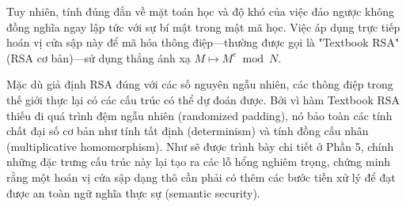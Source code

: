 Tuy nhiên, tính đúng đắn về mặt toán học và độ khó của việc đảo ngược không đồng nghĩa ngay lập tức với sự bí mật trong mật mã học. Việc áp dụng trực tiếp hoán vị cửa sập này để mã hóa thông điệp---thường được gọi là "Textbook RSA" (RSA cơ bản)---sử dụng thẳng ánh xạ $M \mapsto M^e \bmod N$.

Mặc dù giả định RSA đúng với các số nguyên ngẫu nhiên, các thông điệp trong thế giới thực lại có các cấu trúc có thể dự đoán được. Bởi vì hàm Textbook RSA thiếu đi quá trình đệm ngẫu nhiên (randomized padding), nó bảo toàn các tính chất đại số cơ bản như tính tất định (determinism) và tính đồng cấu nhân (multiplicative homomorphism). Như sẽ được trình bày chi tiết ở Phần 5, chính những đặc trưng cấu trúc này lại tạo ra các lỗ hổng nghiêm trọng, chứng minh rằng một hoán vị cửa sập dạng thô cần phải có thêm các bước tiền xử lý để đạt được an toàn ngữ nghĩa thực sự (semantic security).
